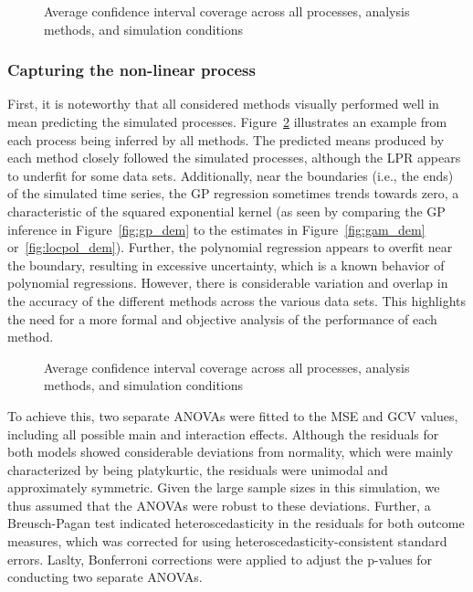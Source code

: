 \documentclass[man, floatsintext]{apa7}
\begin{document}
\begin{figure}[!t]
  \caption{Average confidence interval coverage across all processes, analysis
    methods, and simulation conditions}
  \label{fig:missing}
\end{figure}

\subsubsection{Capturing the non-linear process}

First, it is noteworthy that all considered methods visually performed well in
mean predicting the simulated processes. Figure~\ref{fig:smooth} illustrates an
example from each process being inferred by all methods. The predicted means
produced by each method closely followed the simulated processes, although the
LPR appears to underfit for some data sets. Additionally, near the boundaries
(i.e., the ends) of the simulated time series, the GP regression sometimes
trends towards zero, a characteristic of the squared exponential kernel (as
seen by comparing the GP inference in Figure~\ref{fig:gp_dem} to the estimates
in Figure~\ref{fig:gam_dem} or~\ref{fig:locpol_dem}). Further, the polynomial
regression appears to overfit near the boundary, resulting in excessive
uncertainty, which is a known behavior of polynomial regressions. However,
there is considerable variation and overlap in the accuracy of the different
methods across the various data sets. This highlights the need for a more
formal and objective analysis of the performance of each method.

\begin{figure}[!t]
  \caption{Average confidence interval coverage across all processes, analysis
    methods, and simulation conditions}
  \label{fig:smooth}
\end{figure}

To achieve this, two separate ANOVAs were fitted to the MSE and GCV values,
including all possible main and interaction effects. Although the residuals for
both models showed considerable deviations from normality, which were mainly
characterized by being platykurtic, the residuals were unimodal and
approximately symmetric. Given the large sample sizes in this simulation, we
thus assumed that the ANOVAs were robust to these deviations. Further, a
Breusch-Pagan test indicated heteroscedasticity in the residuals for both
outcome measures, which was corrected for using heteroscedasticity-consistent
standard errors. Laslty, Bonferroni corrections were applied to adjust the
p-values for conducting two separate ANOVAs.
\end{document}
